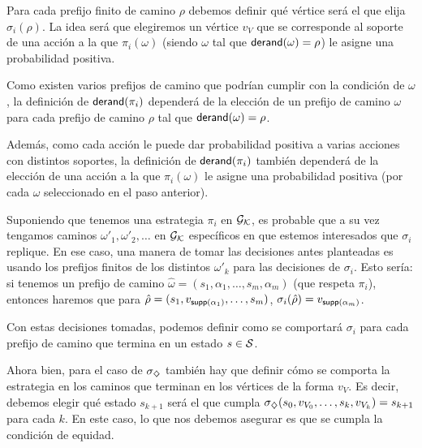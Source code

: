 Para cada prefijo finito de camino $\rho$ debemos definir qué vértice será el
que elija $\sigma_i(\rho)$. La idea será que elegiremos un vértice $v_V$ que se
corresponde al soporte de una acción a la que $\pi_i(\omega)$ (siendo $\omega$
tal que $\textsf{derand}(\omega) = \rho$) le asigne una probabilidad positiva.

Como existen varios prefijos de camino que podrían cumplir con la condición de
$\omega$, la definición de $\textsf{derand}(\pi_i)$ dependerá de la elección de un
prefijo de camino $\omega$ para cada prefijo de camino $\rho$ tal que
$\textsf{derand}(\omega) = \rho$.

Además, como cada acción le puede dar probabilidad positiva a varias acciones
con distintos soportes, la definición de $\textsf{derand}(\pi_i)$ también dependerá de
la elección de una acción a la que $\pi_i(\omega)$ le asigne una probabilidad
positiva (por cada $\omega$ seleccionado en el paso anterior).

\begin{boxgris}{}
	Suponiendo que tenemos una estrategia $\pi_i$ en $\mathcal{G}_{\mathcal{K}}$, es probable que a su vez tengamos caminos $\omega'_1, \omega'_2, \dots$ en $\mathcal{G}_{\mathcal{K}}$ específicos en que estemos interesados que $\sigma_i$ replique. En ese caso, una manera de tomar las decisiones antes planteadas es usando los prefijos finitos de los distintos $\omega'_k$ para las decisiones de $\sigma_i$. Esto sería: si tenemos un prefijo de camino $\hat \omega = (s_1, \alpha_1, \dots, s_m, \alpha_m)$ (que respeta $\pi_i$), entonces haremos que para $\hat \rho = (s_1, v_{\textsf{supp}(\alpha_1)}, \dots, s_m)$, $\sigma_i(\hat \rho) = v_{\textsf{supp}(\alpha_m)}$.
\end{boxgris}

Con estas decisiones tomadas, podemos definir como se comportará $\sigma_i$
para cada prefijo de camino que termina en un estado $s \in \mathcal{S}$.

Ahora bien, para el caso de $\sigma_\diamondsuit$ también hay que definir cómo se
comporta la estrategia en los caminos que terminan en los vértices de la forma
$v_V$. Es decir, debemos elegir qué estado $s_{k+1}$ será el que cumpla
$\sigma_\diamondsuit(s_0, v_{V_0}, \dots, s_k, v_{V_k}) = s_{k+1}$ para cada $k$. En
este caso, lo que nos debemos asegurar es que se cumpla la condición de
equidad.

